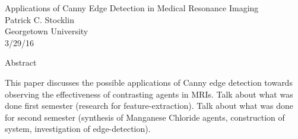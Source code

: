 \documentclass[a4paper,12pt]{article}
\begin{document}
	\begin{center}
	\vspace{0.5cm}
	\huge{Applications of Canny Edge Detection in Medical Resonance Imaging}\\
	\vspace{0.5cm}
	\small{Patrick C. Stocklin}\\

	\small{Georgetown University}\\

	\small{3/29/16}\\
	\end{center}

\begin{section}{Abstract}

This paper discusses the possible applications of Canny edge detection towards observing the effectiveness of contrasting agents in MRIs. Talk about what was done first semester (research for feature-extraction). Talk about what was done for second semester (synthesis of Manganese Chloride agents, construction of system, investigation of edge-detection).

\end{section}

\end{document}
